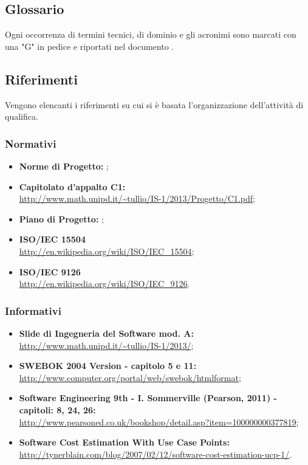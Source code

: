 \subsection{Glossario}
Ogni occorrenza di termini tecnici, di dominio e gli acronimi sono marcati con una "G" in pedice e riportati nel documento \Glossario{}.

\subsection{Riferimenti}
Vengono elencanti i riferimenti su cui si è basata l'organizzazione dell'attività di qualifica.
	\subsubsection{Normativi}
		\begin{itemize}
  			\item \textbf{Norme di Progetto:}  \NormeDiProgetto;
			\item \textbf{Capitolato d'appalto C1:} \\ \url{http://www.math.unipd.it/~tullio/IS-1/2013/Progetto/C1.pdf};
			\item \textbf{Piano di Progetto:} \PianoDiProgetto{};
			\item \textbf{ISO/IEC 15504} \\ \url{http://en.wikipedia.org/wiki/ISO/IEC_15504};
			\item \textbf{ISO/IEC 9126} \\ \url{http://en.wikipedia.org/wiki/ISO/IEC_9126}.
		\end{itemize}
	\subsubsection{Informativi}
		\begin{itemize}
  			\item \textbf{Slide di Ingegneria del Software mod. A:} \\ \url{http://www.math.unipd.it/~tullio/IS-1/2013/};
  			\item \textbf{SWEBOK 2004 Version - capitolo 5 e 11:} \\ \url{http://www.computer.org/portal/web/swebok/htmlformat}; 
  			\item \textbf{Software Engineering 9th - I. Sommerville (Pearson, 2011) - capitoli: 8, 24, 26:} \\ \url{http://www.pearsoned.co.uk/bookshop/detail.asp?item=100000000377819};
  			\item \textbf{Software Cost Estimation With Use Case Points:} \\ \url{http://tynerblain.com/blog/2007/02/12/software-cost-estimation-ucp-1/}.
		\end{itemize}
	


